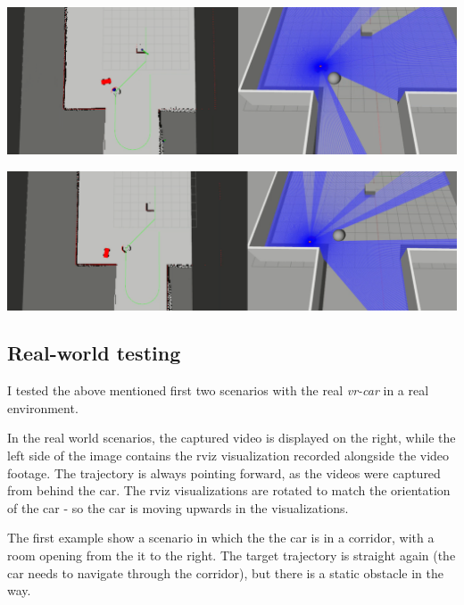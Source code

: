 \begin{center}
	\vspace{0.5cm}
	\includegraphics[width=\textwidth]{figures/raw/local_planner_test_curved_traj_2_static_objects_5.png}

	\vspace{0.5cm}
	\includegraphics[width=\textwidth]{figures/raw/local_planner_test_curved_traj_2_static_objects_6.png}

	\label{local_planner_test_curved_traj_2_static_objects}
\end{center}

\subsection{Real-world testing}
I tested the above mentioned first two scenarios with the real \textit{vr-car} in a real environment.

In the real world scenarios, the captured video is displayed on the right, while the left side of the image contains the rviz visualization recorded alongside the video footage. The trajectory is always pointing forward, as the videos were captured from behind the car. The rviz visualizations are rotated to match the orientation of the car - so the car is moving upwards in the visualizations.

The first example show a scenario in which the the car is in a corridor, with a room opening from the it to the right. The target trajectory is straight again (the car needs to navigate through the corridor), but there is a static obstacle in the way.

